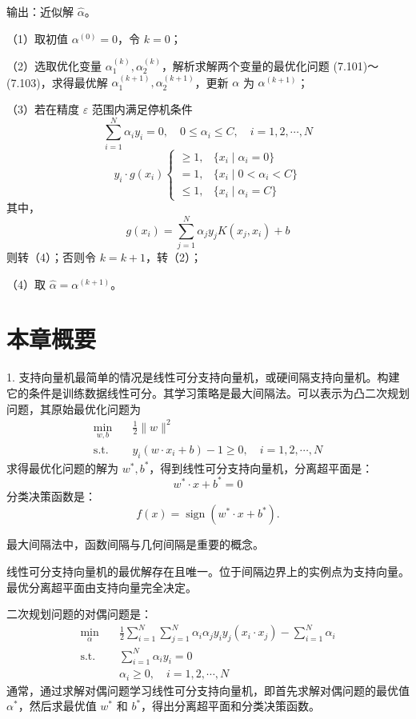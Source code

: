 \documentclass[UTF8, 12pt, fontset=fandol, oneside]{ctexart}
\begin{document}
输出：近似解 $\hat{\alpha}$。

（1）取初值 $\alpha^{(0)}=0$，令 $k=0$；

（2）选取优化变量 $\alpha_1^{(k)},\alpha_2^{(k)}$，解析求解两个变量的最优化问题 (7.101)～(7.103)，求得最优解 $\alpha_1^{(k+1)},\alpha_2^{(k+1)}$，更新 $\alpha$ 为 $\alpha^{(k+1)}$；

（3）若在精度 $\varepsilon$ 范围内满足停机条件
\[
\sum_{i=1}^N\alpha_i y_i=0,\quad 0\leq \alpha_i\leq C,\quad i=1,2,\cdots,N
\]
\[
y_i\cdot g(x_i)
\begin{cases}
\geq 1,& \{x_i\mid \alpha_i=0\}\\
=1,& \{x_i\mid 0<\alpha_i<C\}\\
\leq 1,& \{x_i\mid \alpha_i=C\}
\end{cases}
\]
其中，
\[
g(x_i)=\sum_{j=1}^N\alpha_jy_jK(x_j,x_i)+b
\]
则转（4）；否则令 $k=k+1$，转（2）；

（4）取 $\hat{\alpha}=\alpha^{(k+1)}$。

\section*{本章概要}

1. 支持向量机最简单的情况是线性可分支持向量机，或硬间隔支持向量机。构建它的条件是训练数据线性可分。其学习策略是最大间隔法。可以表示为凸二次规划问题，其原始最优化问题为
\[
\begin{aligned}
\min_{w,b}\quad & \frac{1}{2}\|w\|^2\\
\mathrm{s.t.}\quad & y_i(w\cdot x_i+b)-1\geq 0,\quad i=1,2,\cdots,N
\end{aligned}
\]
求得最优化问题的解为 $w^*,b^*$，得到线性可分支持向量机，分离超平面是：
\[
w^*\cdot x+b^*=0
\]
分类决策函数是：
\[
f(x)=\operatorname{sign}(w^*\cdot x+b^*).
\]

最大间隔法中，函数间隔与几何间隔是重要的概念。

线性可分支持向量机的最优解存在且唯一。位于间隔边界上的实例点为支持向量。最优分离超平面由支持向量完全决定。

二次规划问题的对偶问题是：
\[
\begin{aligned}
\min_\alpha\quad & \frac{1}{2}\sum_{i=1}^N\sum_{j=1}^N\alpha_i\alpha_j y_i y_j(x_i\cdot x_j)-\sum_{i=1}^N\alpha_i\\
\mathrm{s.t.}\quad & \sum_{i=1}^N\alpha_i y_i=0\\
& \alpha_i\geq 0,\quad i=1,2,\cdots,N
\end{aligned}
\]
通常，通过求解对偶问题学习线性可分支持向量机，即首先求解对偶问题的最优值 $\alpha^*$，然后求最优值 $w^*$ 和 $b^*$，得出分离超平面和分类决策函数。
\end{document}
